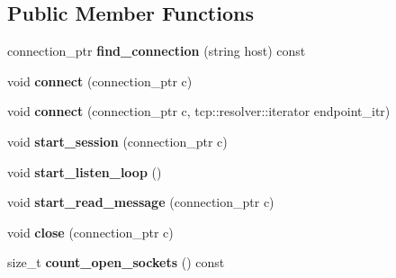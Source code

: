 \subsection*{Public Member Functions}
\begin{DoxyCompactItemize}
\item 
\mbox{\label{classaacio_1_1net__plugin__impl_a08b0ce1b83d97e45d1682847140d3253}} 
connection\+\_\+ptr {\bfseries find\+\_\+connection} (string host) const
\item 
\mbox{\label{classaacio_1_1net__plugin__impl_ac68ef01c7f02ed8e2ebeab1b56837f01}} 
void {\bfseries connect} (connection\+\_\+ptr c)
\item 
\mbox{\label{classaacio_1_1net__plugin__impl_ade0eb09faf1bbf781070d5e42fb3d1f3}} 
void {\bfseries connect} (connection\+\_\+ptr c, tcp\+::resolver\+::iterator endpoint\+\_\+itr)
\item 
\mbox{\label{classaacio_1_1net__plugin__impl_a18bd33340a0ab93339160ad7ad83e9c4}} 
void {\bfseries start\+\_\+session} (connection\+\_\+ptr c)
\item 
\mbox{\label{classaacio_1_1net__plugin__impl_ae167fe10965fc02532990e83a449389d}} 
void {\bfseries start\+\_\+listen\+\_\+loop} ()
\item 
\mbox{\label{classaacio_1_1net__plugin__impl_a48994f6c7b1a8d439c6788ec247dfc57}} 
void {\bfseries start\+\_\+read\+\_\+message} (connection\+\_\+ptr c)
\item 
\mbox{\label{classaacio_1_1net__plugin__impl_a08455bbb20fbd7cd438902820a96efc7}} 
void {\bfseries close} (connection\+\_\+ptr c)
\item 
\mbox{\label{classaacio_1_1net__plugin__impl_a0a07e6fe3d771946fe439596511eb302}} 
size\+\_\+t {\bfseries count\+\_\+open\+\_\+sockets} () const
\item 
\mbox{\label{classaacio_1_1net__plugin__impl_a29eafeafcc31e81c11627e25a0859719}} 

\end{DoxyCompactItemize}
